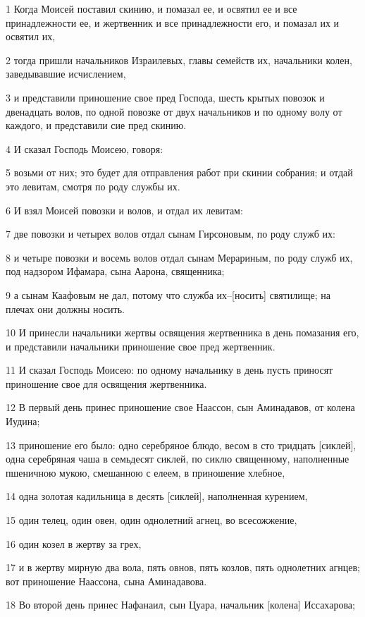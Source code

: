 \par 1 Когда Моисей поставил скинию, и помазал ее, и освятил ее и все принадлежности ее, и жертвенник и все принадлежности его, и помазал их и освятил их,
\par 2 тогда пришли начальников Израилевых, главы семейств их, начальники колен, заведывавшие исчислением,
\par 3 и представили приношение свое пред Господа, шесть крытых повозок и двенадцать волов, по одной повозке от двух начальников и по одному волу от каждого, и представили сие пред скинию.
\par 4 И сказал Господь Моисею, говоря:
\par 5 возьми от них; это будет для отправления работ при скинии собрания; и отдай это левитам, смотря по роду службы их.
\par 6 И взял Моисей повозки и волов, и отдал их левитам:
\par 7 две повозки и четырех волов отдал сынам Гирсоновым, по роду служб их:
\par 8 и четыре повозки и восемь волов отдал сынам Мерариным, по роду служб их, под надзором Ифамара, сына Аарона, священника;
\par 9 а сынам Каафовым не дал, потому что служба их--[носить] святилище; на плечах они должны носить.
\par 10 И принесли начальники жертвы освящения жертвенника в день помазания его, и представили начальники приношение свое пред жертвенник.
\par 11 И сказал Господь Моисею: по одному начальнику в день пусть приносят приношение свое для освящения жертвенника.
\par 12 В первый день принес приношение свое Наассон, сын Аминадавов, от колена Иудина;
\par 13 приношение его было: одно серебряное блюдо, весом в сто тридцать [сиклей], одна серебряная чаша в семьдесят сиклей, по сиклю священному, наполненные пшеничною мукою, смешанною с елеем, в приношение хлебное,
\par 14 одна золотая кадильница в десять [сиклей], наполненная курением,
\par 15 один телец, один овен, один однолетний агнец, во всесожжение,
\par 16 один козел в жертву за грех,
\par 17 и в жертву мирную два вола, пять овнов, пять козлов, пять однолетних агнцев; вот приношение Наассона, сына Аминадавова.
\par 18 Во второй день принес Нафанаил, сын Цуара, начальник [колена] Иссахарова;
